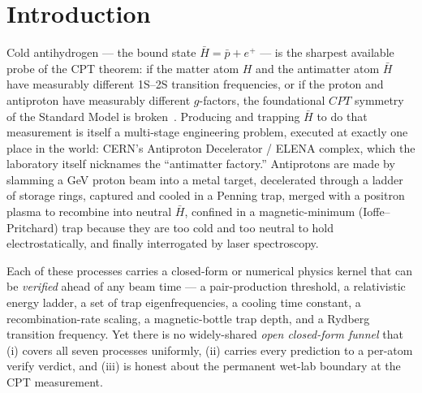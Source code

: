 \documentclass[11pt,a4paper]{article}
\begin{document}
\section{Introduction}
\label{sec:intro}

Cold antihydrogen --- the bound state $\bar H = \bar p + e^+$ --- is the
sharpest available probe of the CPT theorem: if the matter atom $H$ and the
antimatter atom $\bar H$ have measurably different 1S--2S transition
frequencies, or if the proton and antiproton have measurably different
$g$-factors, the foundational $CPT$ symmetry of the Standard Model is
broken~\citep{ahmadi2018alpha1s2s,smorra2017base}. Producing and trapping
$\bar H$ to do that measurement is itself a multi-stage engineering
problem, executed at exactly one place in the world: CERN's Antiproton
Decelerator / ELENA complex, which the laboratory itself nicknames the
``antimatter factory.'' Antiprotons are made by slamming a GeV proton beam
into a metal target, decelerated through a ladder of storage rings, captured
and cooled in a Penning trap, merged with a positron plasma to recombine
into neutral $\bar H$, confined in a magnetic-minimum (Ioffe--Pritchard)
trap because they are too cold and too neutral to hold electrostatically,
and finally interrogated by laser spectroscopy.

Each of these processes carries a closed-form or numerical physics kernel
that can be \emph{verified} ahead of any beam time --- a pair-production
threshold, a relativistic energy ladder, a set of trap eigenfrequencies, a
cooling time constant, a recombination-rate scaling, a magnetic-bottle trap
depth, and a Rydberg transition frequency. Yet there is no widely-shared
\emph{open closed-form funnel} that (i) covers all seven processes
uniformly, (ii) carries every prediction to a per-atom verify verdict, and
(iii) is honest about the permanent wet-lab boundary at the CPT measurement.
\end{document}
